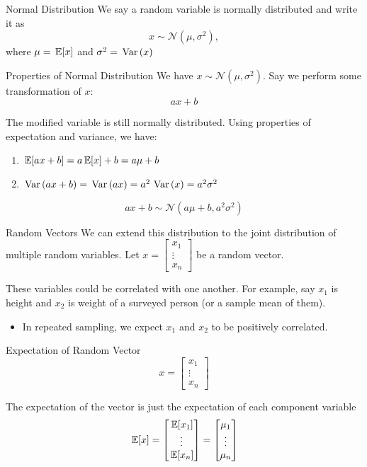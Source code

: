 \documentclass[aspectratio=169,t,11pt,table]{beamer}
\begin{document}
\begin{frame}{Normal Distribution}
  We say a random variable is normally distributed and write it as 
  $$
    x \sim \mathcal{N}(\mu, \sigma^2),
  $$
  where $\mu = \expec{x}$ and $\sigma^2 = \var{x}$
\end{frame}


\begin{frame}{Properties of Normal Distribution}
  We have $x \sim \mathcal{N}(\mu, \sigma^2)$. Say we perform some transformation of $x$:
  $$
    ax + b
  $$

  The modified variable is still normally distributed. Using properties of expectation and variance, we have:
  \begin{enumerate}
    \item $\expec{ax + b} = a\expec{x} + b = a\mu + b$
    
    \item $\var{ax + b} = \var{ax} = a^2 \var{x} = a^2 \sigma^2$
  \end{enumerate}


  \pause
  $$
    ax + b \sim \mathcal{N}\left(a\mu + b, a^2 \sigma^2\right)
  $$
\end{frame}

\begin{frame}{Random Vectors}
  We can extend this distribution to the \alert{joint distribution} of multiple random variables. Let $x = \begin{bmatrix}x_1 \\ \vdots \\ x_n \end{bmatrix}$ be a \alert{random vector}. 

  \bigskip
  These variables could be correlated with one another. For example, say $x_1$ is height and $x_2$ is weight of a surveyed person (or a sample mean of them).
  \begin{itemize}
    \item In repeated sampling, we expect $x_1$ and $x_2$ to be positively correlated. 
  \end{itemize}
\end{frame}

\begin{frame}{Expectation of Random Vector}
  \vspace*{-\bigskipamount}
  $$
    x = \begin{bmatrix}x_1 \\ \vdots \\ x_n \end{bmatrix}
  $$

  The expectation of the vector is just the expectation of each component variable
  $$
    \expec{x} = \begin{bmatrix} \expec{x_1} \\ \vdots \\ \expec{x_n} \end{bmatrix} = \begin{bmatrix} \mu_1 \\ \vdots \\ \mu_n \end{bmatrix}
  $$
\end{frame}
\end{document}

